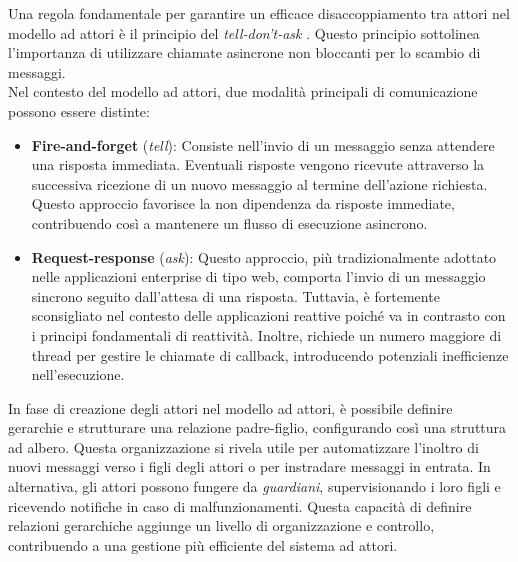 Una regola fondamentale per garantire un efficace disaccoppiamento tra attori nel modello ad attori è il principio del \textit{tell-don't-ask} \cite{tellDontAsk}.
Questo principio sottolinea l'importanza di utilizzare chiamate asincrone non bloccanti per lo scambio di messaggi. \\
Nel contesto del modello ad attori, due modalità principali di comunicazione possono essere distinte:
\begin{itemize}
    \item \textbf{Fire-and-forget} (\textit{tell}): Consiste nell'invio di un messaggio senza attendere una risposta immediata.
    Eventuali risposte vengono ricevute attraverso la successiva ricezione di un nuovo messaggio al termine dell'azione richiesta.
    Questo approccio favorisce la non dipendenza da risposte immediate, contribuendo così a mantenere un flusso di esecuzione asincrono.
    \item \textbf{Request-response} (\textit{ask}): Questo approccio, più tradizionalmente adottato nelle applicazioni enterprise di tipo web, comporta l'invio di un messaggio sincrono seguito dall'attesa di una risposta.
    Tuttavia, è fortemente sconsigliato nel contesto delle applicazioni reattive poiché va in contrasto con i principi fondamentali di reattività.
    Inoltre, richiede un numero maggiore di thread per gestire le chiamate di callback, introducendo potenziali inefficienze nell'esecuzione.
\end{itemize}

In fase di creazione degli attori nel modello ad attori, è possibile definire gerarchie e strutturare una relazione padre-figlio, configurando così una struttura ad albero.
Questa organizzazione si rivela utile per automatizzare l'inoltro di nuovi messaggi verso i figli degli attori o per instradare messaggi in entrata.
In alternativa, gli attori possono fungere da \textit{guardiani}, supervisionando i loro figli e ricevendo notifiche in caso di malfunzionamenti.
Questa capacità di definire relazioni gerarchiche aggiunge un livello di organizzazione e controllo, contribuendo a una gestione più efficiente del sistema ad attori.

